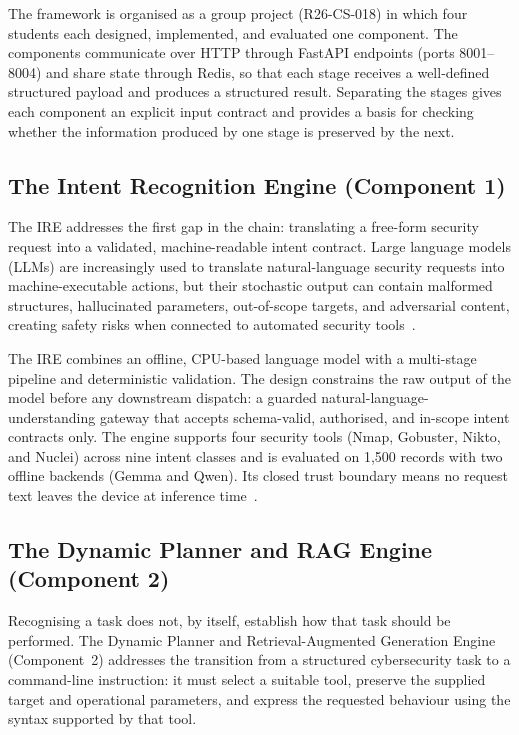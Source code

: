 The framework is organised as a group project (R26-CS-018) in which four
students each designed, implemented, and evaluated one component. The components
communicate over HTTP through FastAPI endpoints (ports 8001--8004) and share
state through Redis, so that each stage receives a well-defined structured
payload and produces a structured result. Separating the stages gives each
component an explicit input contract and provides a basis for checking whether
the information produced by one stage is preserved by the next.

\subsection{The Intent Recognition Engine (Component 1)}\label{sec:ctx-ire}

The IRE addresses the first gap in the chain: translating a free-form security
request into a validated, machine-readable intent contract. Large language
models (LLMs) are increasingly used to translate natural-language security
requests into machine-executable actions, but their stochastic output can
contain malformed structures, hallucinated parameters, out-of-scope targets, and
adversarial content, creating safety risks when connected to automated security
tools~\cite{deng2024pentestgpt}.

The IRE combines an offline, CPU-based language model with a multi-stage
pipeline and deterministic validation. The design constrains the raw output of
the model before any downstream dispatch: a guarded natural-language-understanding
gateway that accepts schema-valid, authorised, and in-scope intent contracts only.
The engine supports four security tools (Nmap, Gobuster, Nikto, and Nuclei) across
nine intent classes and is evaluated on 1,500 records with two offline backends
(Gemma and Qwen). Its closed trust boundary means no request text leaves the
device at inference time~\cite{liu2023promptinjection,nistairmf2023}.

\subsection{The Dynamic Planner and RAG Engine (Component 2)}\label{sec:ctx-planner}

Recognising a task does not, by itself, establish how that task should be
performed. The Dynamic Planner and Retrieval-Augmented Generation Engine
(Component~2) addresses the transition from a structured cybersecurity task to a
command-line instruction: it must select a suitable tool, preserve the supplied
target and operational parameters, and express the requested behaviour using the
syntax supported by that tool.

